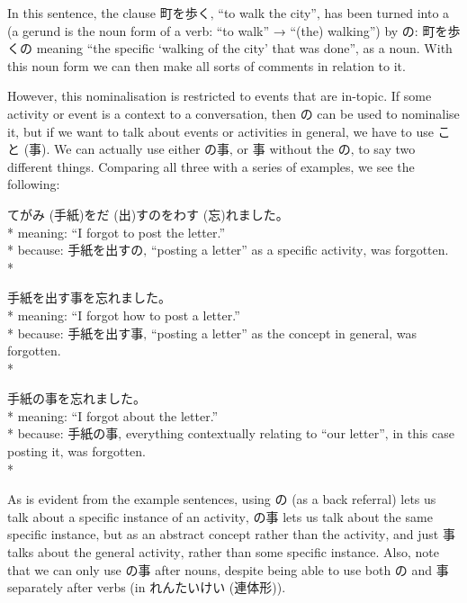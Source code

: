 \documentclass[11pt, b5paper, twoside, openright, onecolumn]{book}
\makeatletter
\newcommand*{\rubystack}[2]{{\relscale{0.5}%
  \begin{tabular}[b]{@{}c@{}}%
    {#1}\\%
   {\textscale{2}{#2}}%
  \end{tabular}}%
}
\DeclareRobustCommand*{\ruby}[2]{%
  \mbox{%
    \setlength{\parskip}{0ex}%
    \BeginAccSupp{method=pdfstringdef,ActualText={#1}}%
      \rubystack{\phantom{#2}}{#1}%
      \llap{%
        \rubystack{#2}{\phantom{#1}}%
      }%
    \EndAccSupp{}%
  }%
}
\renewcommand*{\ruby}[2]{#2 (#1)}%
\newenvironment{exampleblock}{
\setlength{\parindent}{0.6in}
\begin{minipage}[t]{\dimexpr\textwidth-\parindent}}
{\end{minipage}}
\makeatother
\begin{document}
In this sentence‚ the clause 町を歩く‚ “to walk the city”‚ has been turned into a  (a gerund is the noun form of a verb: “to walk” → “(the) walking”) by の: 町を歩くの meaning “the specific ‘walking of the city’ that was done”‚ as a noun. With this noun form we can then make all sorts of comments in relation to it.

However‚ this nominalisation is restricted to events that are in-topic. If some activity or event is a context to a conversation‚ then の can be used to nominalise it‚ but if we want to talk about events or activities in general‚ we have to use \ruby{事}{こと}. We can actually use either の事‚ or 事 without the の‚ to say two different things. Comparing all three with a series of examples‚ we see the following:

\vspace{0.4cm}
\begin{exampleblock}
\ruby{手紙}{てがみ}を\ruby{出}{だ}すのを\ruby{忘}{わす}れました。 \\* 
meaning: “I forgot to post the letter.” \\* 
because: 手紙を出すの‚ “posting a letter” as a specific activity‚ was forgotten. \\* 
\end{exampleblock}
\vspace{0.2cm}

\begin{exampleblock}
手紙を出す事を忘れました。 \\* 
meaning: “I forgot how to post a letter.” \\* 
because: 手紙を出す事‚ “posting a letter” as the concept in general‚ was forgotten. \\* 
\end{exampleblock}
\vspace{0.2cm}

\begin{exampleblock}
手紙の事を忘れました。 \\* 
meaning: “I forgot about the letter.” \\* 
because: 手紙の事‚ everything contextually relating to “our letter”‚ in this case posting it‚ was forgotten. \\* 
\end{exampleblock}
\vspace{0.2cm}


As is evident from the example sentences‚ using の (as a back referral) lets us talk about a specific instance of an activity‚ の事 lets us talk about the same specific instance‚ but as an abstract concept rather than the activity‚ and just 事 talks about the general activity‚ rather than some specific instance. Also‚ note that we can only use の事 after nouns‚ despite being able to use both の and 事 separately after verbs (in \ruby{連体形}{れんたいけい}).
\end{document}
